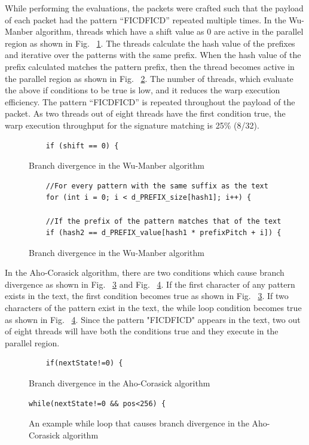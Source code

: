 While performing the evaluations, the packets were crafted such that the payload of each packet had the pattern “FICDFICD” repeated multiple times. In the Wu-Manber algorithm, threads which have a shift value as 0 are active in the parallel region as shown in Fig. ~\ref{fig:wumanbranchdiv}. The threads calculate the hash value of the prefixes and iterative over the patterns with the same prefix. When the hash value of the prefix calculated matches the pattern prefix, then the thread becomes active in the parallel region as shown in Fig. ~\ref{fig:wumanbranchdivfor}. The number of threads, which evaluate the above if conditions to be true is low, and it reduces the warp execution efficiency. The pattern “FICDFICD” is repeated throughout the payload of the packet. As two threads out of eight threads have the first condition true, the warp execution throughput for the signature matching is 25\% (8/32).

\begin{figure}[H]
	\centering
	\begin{lstlisting}
	if (shift == 0) {
	\end{lstlisting}
	\caption{Branch divergence in the Wu-Manber algorithm}
	\label{fig:wumanbranchdiv}
\end{figure}
\squeezeup
\begin{figure}[H]
	\centering
	\begin{lstlisting}
	//For every pattern with the same suffix as the text
	for (int i = 0; i < d_PREFIX_size[hash1]; i++) {
	
	//If the prefix of the pattern matches that of the text
	if (hash2 == d_PREFIX_value[hash1 * prefixPitch + i]) {
	\end{lstlisting}
	\caption{Branch divergence in the Wu-Manber algorithm}
	\label{fig:wumanbranchdivfor}
\end{figure}
\squeezeup

In the Aho-Corasick algorithm, there are two conditions which cause branch divergence as shown in Fig. ~\ref{fig:ahocorbranchdiv} and Fig. ~\ref{fig:ahocorbranchdivfor}. If the first character of any pattern exists in the text, the first condition becomes true as shown in Fig. ~\ref{fig:ahocorbranchdiv}. If two characters of the pattern exist in the text, the while loop condition becomes true as shown in Fig. ~\ref{fig:ahocorbranchdivfor}. Since the pattern "FICDFICD" appears in the text, two out of eight threads will have both the conditions true and they execute in the parallel region.

\begin{figure}[H]
	\centering
	\begin{lstlisting}
	if(nextState!=0) {
	\end{lstlisting}
	\caption{Branch divergence in the Aho-Corasick algorithm}
	\label{fig:ahocorbranchdiv}
\end{figure}
\squeezeup
\begin{figure}[H]
\centering
\begin{lstlisting}
while(nextState!=0 && pos<256) {
\end{lstlisting}
\caption{An example while loop that causes branch divergence in the Aho-Corasick algorithm}
\label{fig:ahocorbranchdivfor}
\end{figure}
\squeezeup

